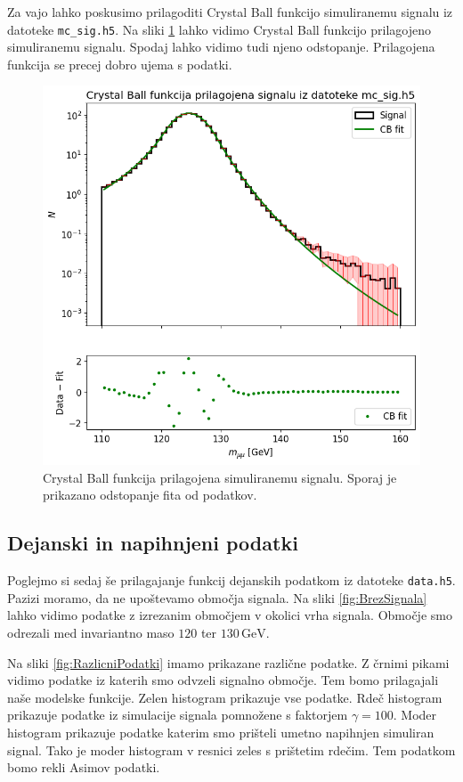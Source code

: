 \documentclass[slovene,11pt,a4paper]{article}
\begin{document}
Za vajo lahko poskusimo prilagoditi Crystal Ball funkcijo simuliranemu signalu iz datoteke \texttt{mc\_sig.h5}. Na sliki \ref{fig:CB} lahko vidimo Crystal Ball funkcijo prilagojeno simuliranemu signalu. Spodaj lahko vidimo tudi njeno odstopanje. Prilagojena funkcija se precej dobro ujema s podatki.

\begin{figure}[h!]
    \centering
    \includegraphics[width=0.8\linewidth]{imgs/CB.png}
    \caption{Crystal Ball funkcija prilagojena simuliranemu signalu. Sporaj je prikazano odstopanje fita od podatkov.}
    \label{fig:CB}
\end{figure}

\subsection{Dejanski in napihnjeni podatki}

Poglejmo si sedaj še prilagajanje funkcij dejanskih podatkom iz datoteke \texttt{data.h5}. Pazizi moramo, da ne upoštevamo območja signala. Na sliki \ref{fig:BrezSignala} lahko vidimo podatke z izrezanim območjem v okolici vrha signala. Območje smo odrezali med invariantno maso $120$ ter $130 \, \text{GeV}$.

Na sliki \ref{fig:RazlicniPodatki} imamo prikazane različne podatke. Z črnimi pikami vidimo podatke iz katerih smo odvzeli signalno območje. Tem bomo prilagajali naše modelske funkcije. Zelen histogram prikazuje vse podatke. Rdeč histogram prikazuje podatke iz simulacije signala pomnožene s faktorjem $\gamma = 100$. Moder histogram prikazuje podatke katerim smo prišteli umetno napihnjen simuliran signal. Tako je moder histogram v resnici zeles s prištetim rdečim. Tem podatkom bomo rekli Asimov podatki.
\end{document}
